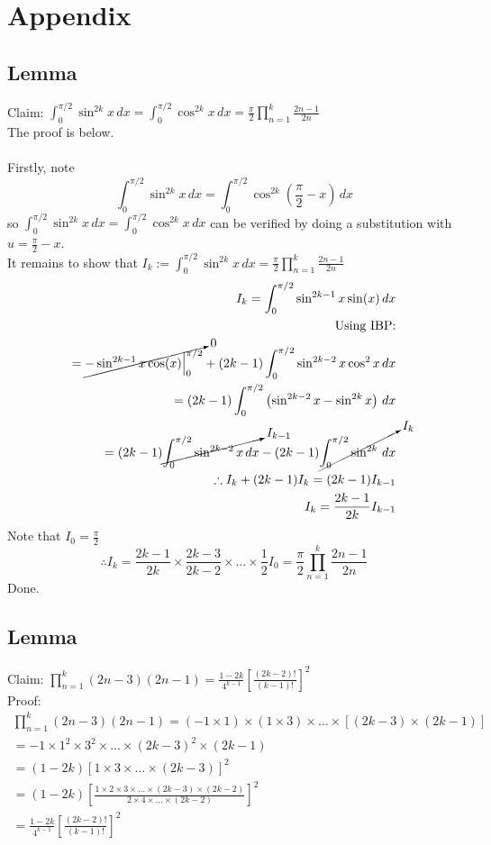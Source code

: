\documentclass{article}
\begin{document}
\clearpage
\section{Appendix}

\subsection{Lemma}
Claim: $
	\int_{0}^{\pi/2}\sin^{2k}x\,dx
	= \int_{0}^{\pi/2}\cos^{2k}x\,dx
	= \frac{\pi}{2}\prod_{n=1}^{k}\frac{2n-1}{2n}
	$\\
The proof is below.\\\\
Firstly, note \[
	\int_{0}^{\pi/2}\sin^{2k}x\,dx =
	\int_{0}^{\pi/2}\cos^{2k}(\frac{\pi}{2}-x)\,dx
	\]
so 
$ \int_{0}^{\pi/2}\sin^{2k}x\,dx = \int_{0}^{\pi/2}\cos^{2k}x\,dx $
can be verified by doing a substitution with $u = \frac{\pi}{2}-x$.\\
It remains to show that
$ I_k := \int_{0}^{\pi/2}\sin^{2k}x\,dx = \frac{\pi}{2}\prod_{n=1}^{k}\frac{2n-1}{2n} $
\begin{equation*}
\begin{split}
	I_k = \int_{0}^{\pi/2}\sin^{2k-1}x\sin(x)\,dx\\
	\text{Using IBP:}\\
	= \cancelto{0}{-\sin^{2k-1}x\cos(x)\Big|_0^{\pi/2}} + (2k-1)\int_0^{\pi/2}\sin^{2k-2}x\cos^2x\,dx\\
	= (2k-1)\int_0^{\pi/2}\left(\sin^{2k-2}x - \sin^{2k}x\right)\,dx\\
	= (2k-1)\cancelto{I_{k-1}}{\int_0^{\pi/2}\sin^{2k-2}x\,dx} - (2k-1)\cancelto{I_k}{\int_0^{\pi/2}\sin^{2k}\,dx}\\
	\therefore I_k + (2k-1)I_k = (2k-1)I_{k-1}\\
	I_k = \frac{2k-1}{2k}I_{k-1}
\end{split}
\end{equation*}
Note that $I_0=\frac{\pi}{2}$
\[\therefore I_k = \frac{2k-1}{2k}\times\frac{2k-3}{2k-2}\times\dots\times\frac{1}{2}I_0 = \frac{\pi}{2}\prod_{n=1}^k\frac{2n-1}{2n}\]
Done.


\subsection{Lemma}
Claim: $\prod_{n=1}^k(2n-3)(2n-1) = \frac{1-2k}{4^{k-1}}\left[\frac{(2k-2)!}{(k-1)!}\right]^2$\\
Proof:
\begin{equation*}
\begin{split}
	\prod_{n=1}^k(2n-3)(2n-1)
	= (-1 \times 1) \times (1\times 3)\times\dots\times[(2k-3)\times(2k-1)]\\
	= -1 \times 1^2 \times 3^2 \times\dots\times(2k-3)^2 \times (2k-1)\\
	= (1-2k)\left[1\times3\times\dots\times(2k-3)\right]^2\\
	= (1-2k)\left[\frac{1\times2\times3\times\dots\times(2k-3)\times(2k-2)}{2\times4\times\dots\times(2k-2)}\right]^2\\
	= \frac{1-2k}{4^{k-1}}\left[\frac{(2k-2)!}{(k-1)!}\right]^2
\end{split}
\end{equation*}
\end{document}
